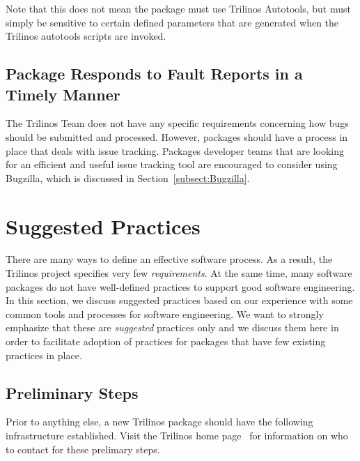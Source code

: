 \documentclass[12pt,relax]{TrilinosDevGuide}
\begin{document}
Note that this does not mean the package must use Trilinos Autotools,
but must simply be sensitive to certain defined parameters that are
generated when the Trilinos autotools scripts are invoked.

\subsection{Package Responds to Fault Reports in a Timely Manner}

The Trilinos Team does not have any specific requirements concerning how 
bugs should be submitted and processed.  However, packages should have a 
process in place that deals with issue tracking.  Packages developer teams 
that are looking for an efficient and useful issue tracking tool are 
encouraged to consider using Bugzilla, which is discussed in 
Section~\ref{subsect:Bugzilla}.

\section{Suggested Practices}
\label{Section:SuggestPractices}

There are many ways to define an effective software process.  As a result, the 
Trilinos project specifies very few {\it requirements}.  At the same time, 
many software packages do not have well-defined practices to support good 
software engineering.  In this section, we discuss suggested practices based 
on our experience with some common tools and processes for software 
engineering.  We want to strongly emphasize that these are {\it suggested} 
practices only and we discuss them here in order to facilitate adoption of 
practices for packages that have few existing practices in place.

\subsection{Preliminary Steps}

Prior to anything else, a new Trilinos package should have the
following infrastructure established.  Visit the Trilinos home
page~\cite{Trilinos-home-page} for information on who to contact for
these prelimary steps.
\end{document}
